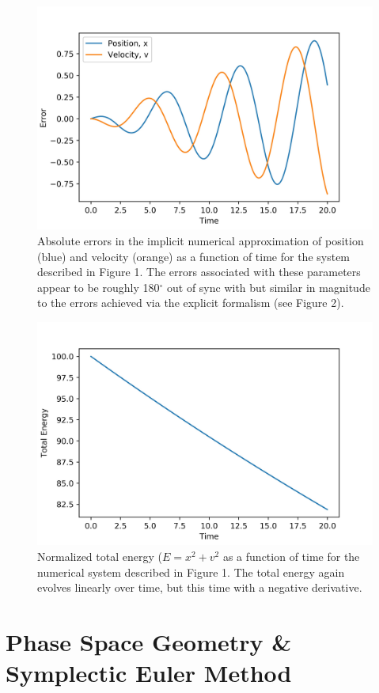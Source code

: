 \documentclass{article}
\begin{document}
\begin{figure}[H]
\includegraphics[width=\textwidth]{Terr2.jpg}
\caption{Absolute errors in the implicit numerical approximation of position (blue) and velocity (orange) as a function of time for the system described in Figure 1. The errors associated with these parameters appear to be roughly 180$^\circ$ out of sync with but similar in magnitude to the errors achieved via the explicit formalism (see Figure 2).}
\end{figure}
\begin{figure}[H]
\includegraphics[width=\textwidth]{TE2.jpg}
\caption{Normalized total energy ($E = x^2 + v^2$ as a function of time for the numerical system described in Figure 1. The total energy again evolves linearly over time, but this time with a negative derivative.}
\end{figure}

\section{Phase Space Geometry \& Symplectic Euler Method}
\end{document}
